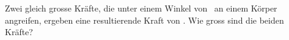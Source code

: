 Zwei gleich grosse Kräfte, die unter einem Winkel von \alGO\ an einem Körper angreifen, ergeben eine resultierende Kraft von \FRgO. Wie gross sind die beiden Kräfte?
